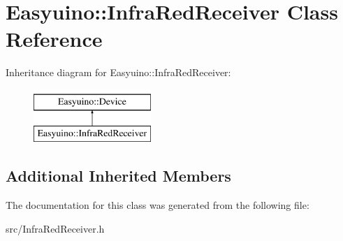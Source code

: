 \hypertarget{class_easyuino_1_1_infra_red_receiver}{}\section{Easyuino\+:\+:Infra\+Red\+Receiver Class Reference}
\label{class_easyuino_1_1_infra_red_receiver}
Inheritance diagram for Easyuino\+:\+:Infra\+Red\+Receiver\+:\begin{figure}[H]
\begin{center}
\leavevmode
\includegraphics[height=2.000000cm]{class_easyuino_1_1_infra_red_receiver}
\end{center}
\end{figure}
\subsection*{Additional Inherited Members}


The documentation for this class was generated from the following file\+:\begin{DoxyCompactItemize}
\item 
src/Infra\+Red\+Receiver.\+h\end{DoxyCompactItemize}
